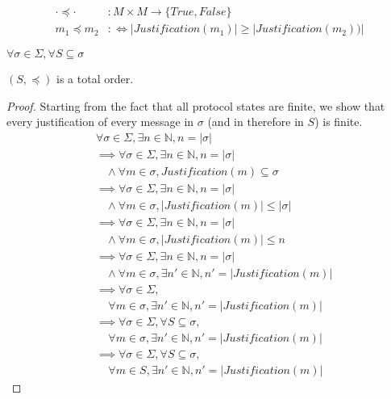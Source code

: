 \begin{defn}[$\preceq$]
\begin{align*}
\cdot \preceq \cdot &: M \times M \to \{True, False\} \\
m_1 \preceq m_2 &:\Leftrightarrow |Justification(m_1)| \geq |Justification(m_2))|
\end{align*}
\end{defn}


\begin{lemma}
$\forall \sigma \in \Sigma, \forall S \subseteq \sigma$

$(S, \preceq)$ is a total order.
\end{lemma}

\begin{proof}
Starting from the fact that all protocol states are finite, we show that every justification of every message in $\sigma$ (and in therefore in $S$) is finite.
\begin{align*}
&\forall \sigma \in \Sigma, \exists n \in \mathbb{N}, n = |\sigma| \\
&\implies \forall \sigma \in \Sigma, \exists n \in \mathbb{N}, n = |\sigma| \\
&~~~~\land \forall m \in \sigma, Justification(m) \subseteq \sigma
\\
&\implies \forall \sigma \in \Sigma, \exists n \in \mathbb{N}, n = |\sigma| \\
&~~~~\land \forall m \in \sigma, |Justification(m)| \leq |\sigma|
\\
&\implies \forall \sigma \in \Sigma, \exists n \in \mathbb{N}, n = |\sigma| \\
&~~~~\land \forall m \in \sigma, |Justification(m)| \leq n
\\
&\implies \forall \sigma \in \Sigma, \exists n \in \mathbb{N}, n = |\sigma| \\
&~~~~\land \forall m \in \sigma, \exists n' \in \mathbb{N}, n' = |Justification(m)|
\\
&\implies \forall \sigma \in \Sigma, \\
&~~~~~\forall m \in \sigma, \exists n' \in \mathbb{N}, n' = |Justification(m)|
\\
&\implies \forall \sigma \in \Sigma, \forall S \subseteq \sigma, \\
&~~~~~\forall m \in \sigma, \exists n' \in \mathbb{N}, n' = |Justification(m)|
\\
&\implies \forall \sigma \in \Sigma, \forall S \subseteq \sigma, \\
&~~~~~\forall m \in S, \exists n' \in \mathbb{N}, n' = |Justification(m)|
\end{align*}


\end{proof}
